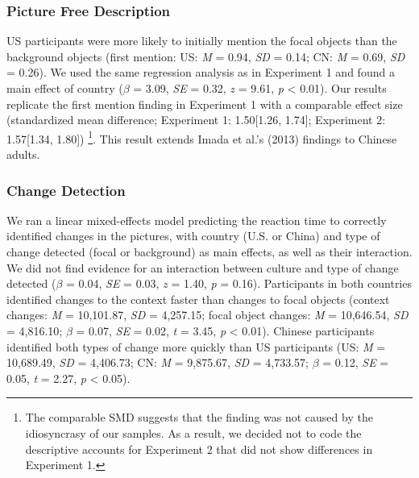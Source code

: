 \documentclass[
  man,floatsintext]{apa6}
\begin{document}
\hypertarget{picture-free-description-2}{%
\subsubsection{Picture Free Description}\label{picture-free-description-2}}

US participants were more likely to initially mention the focal objects than the background objects (first mention: US: \emph{M} = 0.94, \emph{SD} = 0.14; CN: \emph{M} = 0.69, \emph{SD} = 0.26). We used the same regression analysis as in Experiment 1 and found a main effect of country (\(\beta\) = 3.09, \emph{SE} = 0.32, \emph{z} = 9.61, \emph{p} \textless{} 0.01). Our results replicate the first mention finding in Experiment 1 with a comparable effect size (standardized mean difference; Experiment 1: 1.50{[}1.26, 1.74{]}; Experiment 2: 1.57{[}1.34, 1.80{]}) \footnote{The comparable SMD suggests that the finding was not caused by the idiosyncrasy of our samples. As a result, we decided not to code the descriptive accounts for Experiment 2 that did not show differences in Experiment 1.}. This result extends Imada et al.'s (2013) findings to Chinese adults.

\hypertarget{change-detection-1}{%
\subsubsection{Change Detection}\label{change-detection-1}}

We ran a linear mixed-effects model predicting the reaction time to correctly identified changes in the pictures, with country (U.S. or China) and type of change detected (focal or background) as main effects, as well as their interaction. We did not find evidence for an interaction between culture and type of change detected (\(\beta\) = 0.04, \emph{SE} = 0.03, \emph{z} = 1.40, \emph{p} = 0.16). Participants in both countries identified changes to the context faster than changes to focal objects (context changes: \emph{M} = 10,101.87, \emph{SD} = 4,257.15; focal object changes: \emph{M} = 10,646.54, \emph{SD} = 4,816.10; \(\beta\) = 0.07, \emph{SE} = 0.02, \emph{t} = 3.45, \emph{p} \textless{} 0.01). Chinese participants identified both types of change more quickly than US participants (US: \emph{M} = 10,689.49, \emph{SD} = 4,406.73; CN: \emph{M} = 9,875.67, \emph{SD} = 4,733.57; \(\beta\) = 0.12, \emph{SE} = 0.05, \emph{t} = 2.27, \emph{p} \textless{} 0.05).
\end{document}

